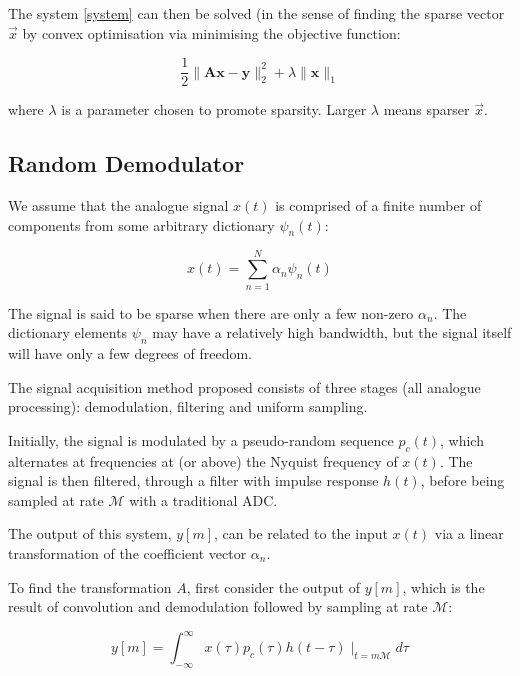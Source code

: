 The system  \ref{system} can then be solved (in the sense of finding the sparse vector \(\vec{x}\) by convex optimisation via minimising the objective function:

\begin{equation}
\frac{1}{2}\|\textbf{Ax}-\textbf{y}\|_2^2 + \lambda \|\textbf{x}\|_1
\end{equation}

where \(\lambda\) is a parameter chosen to promote sparsity. Larger \(\lambda\) means sparser \(\vec{x}\).

\subsection{Random Demodulator}
We assume that the analogue signal \(x\left(t\right)\) is comprised of a finite number of components from some arbitrary dictionary \(\psi_n\left(t\right)\):

\begin{equation}
x\left(t\right) = \sum_{n=1}^N \alpha_n \psi_n\left(t\right)
\end{equation}

The signal is said to be sparse when there are only a few non-zero \(\alpha_n\). The dictionary elements \(\psi_n\) may have a relatively high bandwidth, but the signal itself will have only a few degrees of freedom.

The signal acquisition method proposed consists of three stages (all analogue processing): demodulation, filtering and uniform sampling. 

Initially, the signal is modulated by a pseudo-random sequence \(p_c\left(t\right)\), which alternates at frequencies at (or above) the Nyquist frequency of \(x\left(t\right)\). The signal is then filtered, through a filter with impulse response \(h\left(t\right)\), before being sampled at rate \(\mathcal{M}\) with a traditional ADC.

The output of this system, \(y\left[m\right]\), can be related to the input \(x\left(t\right)\) via a linear transformation of the coefficient vector \(\alpha_n\). 

To find the transformation \(A\), first consider the output of \(y\left[m\right]\), which is the result of convolution and demodulation followed by sampling at rate \(\mathcal{M}\):

\begin{equation}
y\left[m\right] = \int_{-\infty}^{\infty} x\left(\tau\right)p_c\left(\tau\right)h\left(t - \tau\right)\mid_{t = m\mathcal{M}}d\tau
\end{equation}

